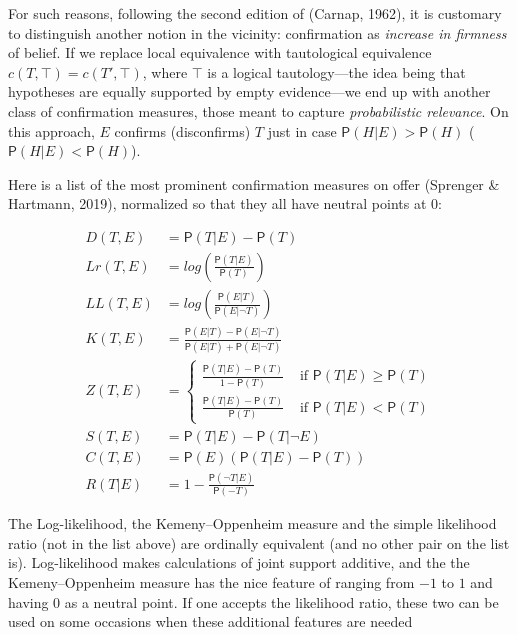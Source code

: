 \documentclass[
  10pt,
  dvipsnames,enabledeprecatedfontcommands]{scrartcl}
\newcommand{\n}{\neg}
\newcommand{\pr}[1]{\mathsf{P}(#1)}
\begin{document}
For such reasons, following the second edition of (Carnap, 1962), it is
customary to distinguish another notion in the vicinity: confirmation as
\textit{increase in firmness} of belief. If we replace local equivalence
with tautological equivalence \(c(T, \top) = c(T', \top)\), where
\(\top\) is a logical tautology---the idea being that hypotheses are
equally supported by empty evidence---we end up with another class of
confirmation measures, those meant to capture
\emph{probabilistic relevance}. On this approach, \(E\) confirms
(disconfirms) \(T\) just in case \(\pr{H \vert E} > \pr{H}\)
(\(\pr{H \vert E} < \pr{H}\)).

Here is a list of the most prominent confirmation measures on offer
(Sprenger \& Hartmann, 2019), normalized so that they all have neutral
points at 0:

\begin{align}
\tag{Difference}  D(T,E) & = \pr{T\vert E} - \pr{T}\\
\tag{Log-ratio}  Lr(T,E) &  = log\left(\frac{\pr{T\vert E}}{\pr{T}} \right) \\
\tag{Log-likelihood}   LL(T,E) & = log\left(\frac{\pr{E \vert T}}{\pr{E \vert \n T}} \right)\\
\tag{Kemeny-Oppenheim}  K(T,E) & = \frac{\pr{E\vert T} - \pr{E \vert \n T}}{\pr{E \vert T} + \pr{E \vert \n T}} \\
\tag{Generalized entailment}  Z(T,E) & = \begin{cases}
\frac{\pr{T\vert E} - \pr{T}}{1-\pr{T}} & \mbox{ if } \pr{T \vert E} \geq \pr{T}\\
\frac{\pr{T\vert E} - \pr{T}}{\pr{T}} & \mbox{ if } \pr{T \vert E} < \pr{T}
\end{cases} \\
\tag{Christensen-Joyce} S(T,E) & = \pr{T \vert E} - \pr{T \vert \n E} \\
\tag{Carnap}  C(T,E) & = \pr{E}(\pr{T\vert E} - \pr{T})\\
\tag{Rips} R(T\vert E) & = 1 - \frac{\pr{\n T\vert E}}{\pr{-T}}
\end{align}

\noindent The Log-likelihood, the Kemeny--Oppenheim measure and the
simple likelihood ratio (not in the list above) are ordinally equivalent
(and no other pair on the list is). Log-likelihood makes calculations of
joint support additive, and the the Kemeny--Oppenheim measure has the
nice feature of ranging from \(-1\) to \(1\) and having 0 as a neutral
point. If one accepts the likelihood ratio, these two can be used on
some occasions when these additional features are needed
\end{document}
